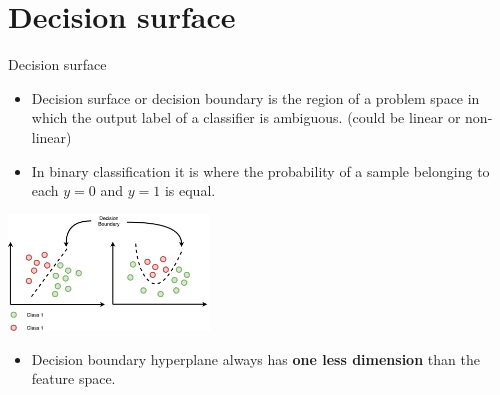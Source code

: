 \documentclass[serif, aspectratio=169]{beamer}
\begin{document}
\section{Decision surface}
\begin{frame}{Decision surface}
    \begin{itemize}
      \item Decision surface or decision boundary is the region of a problem space in which the output label of a classifier is ambiguous. (could be linear or non-linear)
      \item In binary classification it is where the probability of a sample belonging to each $y=0$ and $y=1$ is equal.
    \end{itemize}
    
    
     \begin{center}
        \includegraphics[width=0.4\textwidth]{pic/decision boundary.png}
    \end{center}
    
    \begin{itemize}
        
      \item Decision boundary hyperplane always has \textbf{one less dimension} than the feature space.
      
      
      
     
    \end{itemize}
\end{frame}
\end{document}
